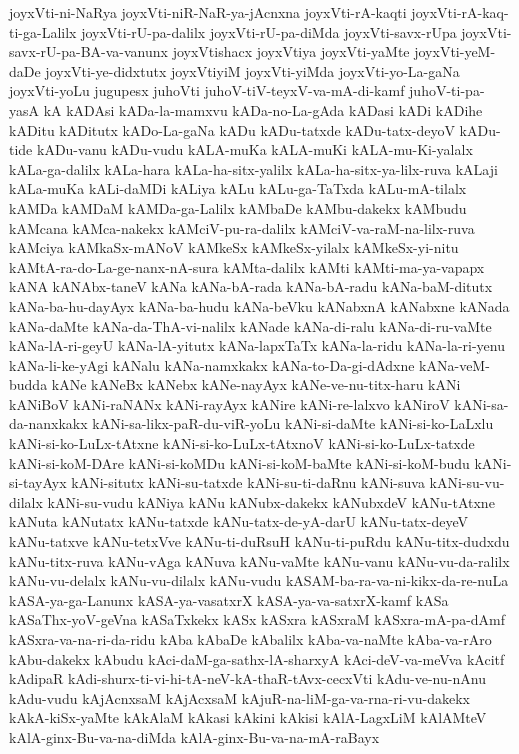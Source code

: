 {joyxVti-ni-NaRya
joyxVti-niR-NaR-ya-jAcnxna
joyxVti-rA-kaqti
joyxVti-rA-kaq-ti-ga-Lalilx
joyxVti-rU-pa-dalilx
joyxVti-rU-pa-diMda
joyxVti-savx-rUpa
joyxVti-savx-rU-pa-BA-va-vanunx
joyxVtishacx
joyxVtiya
joyxVti-yaMte
joyxVti-yeM-daDe
joyxVti-ye-didxtutx
joyxVtiyiM
joyxVti-yiMda
joyxVti-yo-La-gaNa
joyxVti-yoLu
jugupesx
juhoVti
juhoV-tiV-teyxV-va-mA-di-kamf
juhoV-ti-pa-yasA
kA
kADAsi
kADa-la-mamxvu
kADa-no-La-gAda
kADasi
kADi
kADihe
kADitu
kADitutx
kADo-La-gaNa
kADu
kADu-tatxde
kADu-tatx-deyoV
kADu-tide
kADu-vanu
kADu-vudu
kALA-muKa
kALA-muKi
kALA-mu-Ki-yalalx
kALa-ga-dalilx
kALa-hara
kALa-ha-sitx-yalilx
kALa-ha-sitx-ya-lilx-ruva
kALaji
kALa-muKa
kALi-daMDi
kALiya
kALu
kALu-ga-TaTxda
kALu-mA-tilalx
kAMDa
kAMDaM
kAMDa-ga-Lalilx
kAMbaDe
kAMbu-dakekx
kAMbudu
kAMcana
kAMca-nakekx
kAMciV-pu-ra-dalilx
kAMciV-va-raM-na-lilx-ruva
kAMciya
kAMkaSx-mANoV
kAMkeSx
kAMkeSx-yilalx
kAMkeSx-yi-nitu
kAMtA-ra-do-La-ge-nanx-nA-sura
kAMta-dalilx
kAMti
kAMti-ma-ya-vapapx
kANA
kANAbx-taneV
kANa
kANa-bA-rada
kANa-bA-radu
kANa-baM-ditutx
kANa-ba-hu-dayAyx
kANa-ba-hudu
kANa-beVku
kANabxnA
kANabxne
kANada
kANa-daMte
kANa-da-ThA-vi-nalilx
kANade
kANa-di-ralu
kANa-di-ru-vaMte
kANa-lA-ri-geyU
kANa-lA-yitutx
kANa-lapxTaTx
kANa-la-ridu
kANa-la-ri-yenu
kANa-li-ke-yAgi
kANalu
kANa-namxkakx
kANa-to-Da-gi-dAdxne
kANa-veM-budda
kANe
kANeBx
kANebx
kANe-nayAyx
kANe-ve-nu-titx-haru
kANi
kANiBoV
kANi-raNANx
kANi-rayAyx
kANire
kANi-re-lalxvo
kANiroV
kANi-sa-da-nanxkakx
kANi-sa-likx-paR-du-viR-yoLu
kANi-si-daMte
kANi-si-ko-LaLxlu
kANi-si-ko-LuLx-tAtxne
kANi-si-ko-LuLx-tAtxnoV
kANi-si-ko-LuLx-tatxde
kANi-si-koM-DAre
kANi-si-koMDu
kANi-si-koM-baMte
kANi-si-koM-budu
kANi-si-tayAyx
kANi-situtx
kANi-su-tatxde
kANi-su-ti-daRnu
kANi-suva
kANi-su-vu-dilalx
kANi-su-vudu
kANiya
kANu
kANubx-dakekx
kANubxdeV
kANu-tAtxne
kANuta
kANutatx
kANu-tatxde
kANu-tatx-de-yA-darU
kANu-tatx-deyeV
kANu-tatxve
kANu-tetxVve
kANu-ti-duRsuH
kANu-ti-puRdu
kANu-titx-dudxdu
kANu-titx-ruva
kANu-vAga
kANuva
kANu-vaMte
kANu-vanu
kANu-vu-da-ralilx
kANu-vu-delalx
kANu-vu-dilalx
kANu-vudu
kASAM-ba-ra-va-ni-kikx-da-re-nuLa
kASA-ya-ga-Lanunx
kASA-ya-vasatxrX
kASA-ya-va-satxrX-kamf
kASa
kASaThx-yoV-geVna
kASaTxkekx
kASx
kASxra
kASxraM
kASxra-mA-pa-dAmf
kASxra-va-na-ri-da-ridu
kAba
kAbaDe
kAbalilx
kAba-va-naMte
kAba-va-rAro
kAbu-dakekx
kAbudu
kAci-daM-ga-sathx-lA-sharxyA
kAci-deV-va-meVva
kAcitf
kAdipaR
kAdi-shurx-ti-vi-hi-tA-neV-kA-thaR-tAvx-cecxVti
kAdu-ve-nu-nAnu
kAdu-vudu
kAjAcnxsaM
kAjAcxsaM
kAjuR-na-liM-ga-va-rna-ri-vu-dakekx
kAkA-kiSx-yaMte
kAkAlaM
kAkasi
kAkini
kAkisi
kAlA-LagxLiM
kAlAMteV
kAlA-ginx-Bu-va-na-diMda
kAlA-ginx-Bu-va-na-mA-raBayx
}
